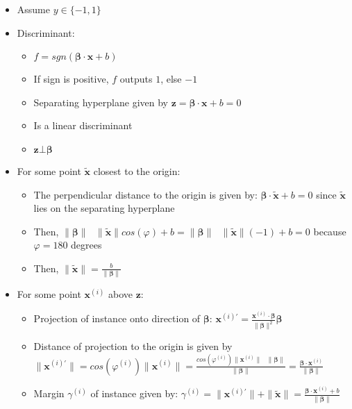 \begin{itemize}
    \item Assume $y \in \{-1,1\}$
    \item Discriminant:
    \begin{itemize}
        \item $f = sgn(\boldsymbol{\beta} \cdot \boldsymbol{x} + b)$
        \item If sign is positive, $f$ outputs $1$, else $-1$
        \item Separating hyperplane given by $\boldsymbol{z} = \boldsymbol{\beta} \cdot \boldsymbol{x} + b = 0$
        \item Is a linear discriminant 
        \item $\boldsymbol{z} \bot \boldsymbol{\beta}$
    \end{itemize}
    \item For some point $\tilde{\boldsymbol{x}}$ closest to the origin:
    \begin{itemize}
        \item The perpendicular distance to the origin is given by: $\boldsymbol{\beta} \cdot\tilde{\boldsymbol{x}} + b = 0$ since $\tilde{\boldsymbol{x}}$ lies on the separating hyperplane
        \item Then, $\| \boldsymbol{\beta} \| \textrm{ } \| \tilde{\boldsymbol{x}} \| cos(\varphi) + b = \| \boldsymbol{\beta} \| \textrm{ } \| \tilde{\boldsymbol{x}} \| (-1) + b = 0$ because $\varphi = 180$ degrees
        \item Then, $\| \tilde{\boldsymbol{x}} \| = \frac{b}{\| \boldsymbol{\beta} \|}$
    \end{itemize}
    \item For some point $\boldsymbol{x}^{(i)}$ above $\boldsymbol{z}$:
    \begin{itemize}
        \item Projection of instance onto direction of $\boldsymbol{\beta}$: $\boldsymbol{x}^{(i)'} = \frac{ \boldsymbol{x}^{(i)} \cdot \boldsymbol{\beta} }{ \| \boldsymbol{\beta} \|^2 } \boldsymbol{\beta}$
        \item Distance of projection to the origin is given by $\| \boldsymbol{x}^{(i)'} \| = cos(\varphi^{(i)}) \| \boldsymbol{x}^{(i)} \| = \frac{ cos(\varphi^{(i)}) \| \boldsymbol{x}^{(i)} \| \textrm{ } \| \boldsymbol{\beta} \| }{ \| \boldsymbol{\beta} \| } = \frac{\boldsymbol{\beta} \cdot \boldsymbol{x}^{(i)}}{ \| \boldsymbol{\beta} \| }$
        \item Margin $\gamma^{(i)}$ of instance given by: $\gamma^{(i)} = \| \boldsymbol{x}^{(i)'} \| + \| \tilde{\boldsymbol{x}} \| = \frac{ \boldsymbol{\beta} \cdot \boldsymbol{x}^{(i)} + b }{\| \boldsymbol{\beta} \|}$

\end{itemize}
\end{itemize}
